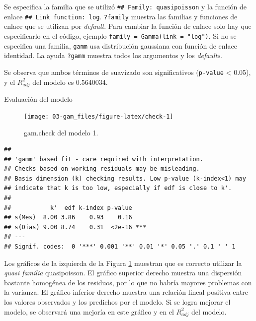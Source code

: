 \documentclass[
]{book}
\newenvironment{Shaded}{\begin{snugshade}}{\end{snugshade}}
\newcommand{\AttributeTok}[1]{\textcolor[rgb]{0.77,0.63,0.00}{#1}}
\newcommand{\DecValTok}[1]{\textcolor[rgb]{0.00,0.00,0.81}{#1}}
\newcommand{\FunctionTok}[1]{\textcolor[rgb]{0.00,0.00,0.00}{#1}}
\newcommand{\NormalTok}[1]{#1}
\newcommand{\SpecialCharTok}[1]{\textcolor[rgb]{0.00,0.00,0.00}{#1}}
\newcommand{\StringTok}[1]{\textcolor[rgb]{0.31,0.60,0.02}{#1}}
\begin{document}
Se especifica la familia que se utilizó \texttt{\#\#\ Family:\ quasipoisson} y la función de enlace \texttt{\#\#\ Link\ function:\ log}. \texttt{?family} muestra las familias y funciones de enlace que se utilizan por \emph{default}. Para cambiar la función de enlace solo hay que especificarlo en el código, ejemplo \texttt{family\ =\ Gamma(link\ =\ "log")}. Si no se especifica una familia, \texttt{gamm} usa distribución gaussiana con función de enlace identidad. La ayuda \texttt{?gamm} muestra todos los argumentos y los \emph{defaults}.

Se observa que ambos términos de suavizado son significativos (\texttt{p-value} \textless{} 0.05), y el \(R_{adj}^{2}\) del modelo es 0.5640034.

Evaluación del modelo

\begin{Shaded}
\end{Shaded}

\begin{figure}

{\centering \texttt{[image: 03-gam\_files/figure-latex/check-1]} 

}

\caption{gam.check del modelo 1.}\label{fig:check}
\end{figure}

\begin{verbatim}
## 
## 'gamm' based fit - care required with interpretation.
## Checks based on working residuals may be misleading.
## Basis dimension (k) checking results. Low p-value (k-index<1) may
## indicate that k is too low, especially if edf is close to k'.
## 
##           k'  edf k-index p-value    
## s(Mes)  8.00 3.86    0.93    0.16    
## s(Dias) 9.00 8.74    0.31  <2e-16 ***
## ---
## Signif. codes:  0 '***' 0.001 '**' 0.01 '*' 0.05 '.' 0.1 ' ' 1
\end{verbatim}

Los gráficos de la izquierda de la Figura \ref{fig:check} muestran que es correcto utilizar la \emph{quasi familia} quasipoisson. El gráfico superior derecho muestra una dispersión bastante homogénea de los residuos, por lo que no habría mayores problemas con la varianza. El gráfico inferior derecho muestra una relación lineal positiva entre los valores observados y los predichos por el modelo. Si se logra mejorar el modelo, se observará una mejoría en este gráfico y en el \(R_{adj}^{2}\) del modelo.
\end{document}
